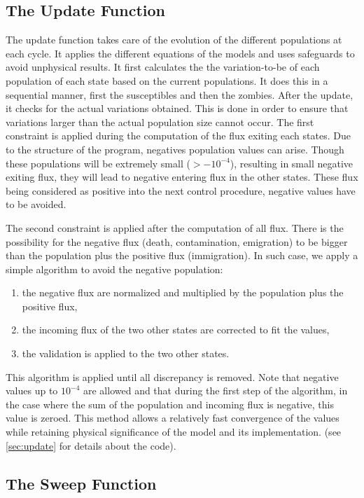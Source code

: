 \documentclass[11pt]{article} %
\begin{document}
\subsection{The Update Function}\indent

The update function takes care of the evolution of the different populations at each cycle. It applies the different equations of the models and uses safeguards to avoid unphysical results. It first calculates the the variation-to-be of each population of each state based on the current populations. It does this in a sequential manner, first the susceptibles and then the zombies. After the update, it checks for the actual variations obtained. This is done in order to ensure that variations larger than the actual population size cannot occur.
The first constraint is applied during the computation of the flux exiting each states. Due to the structure of the program, negatives population values can arise. Though these populations will be extremely small ($> - 10^{-4}$), resulting in small negative exiting flux, they will lead to negative entering flux in the other states. These flux being considered as positive into the next control procedure, negative values have to be avoided.

The second constraint is applied after the computation of all flux. There is the possibility for the negative flux (death, contamination, emigration) to be bigger than the population plus the positive flux (immigration). In such case, we apply a simple algorithm to avoid the negative population:
\begin{enumerate}
	\item the negative flux are normalized and multiplied by the population plus the positive flux,
	\item the incoming flux of the two other states are corrected to fit the values,
	\item the validation is applied to the two other states.
\end{enumerate}
This algorithm is applied until all discrepancy is removed. Note that negative values up to $10^{-4}$ are allowed and that during the first step of the algorithm, in the case where the sum of the population and incoming flux is negative, this value is zeroed. This method allows a relatively fast convergence of the values while retaining physical significance of the model and its implementation. (see \ref{sec:update} for details about the code).


\subsection{The Sweep Function}\indent
\end{document}
